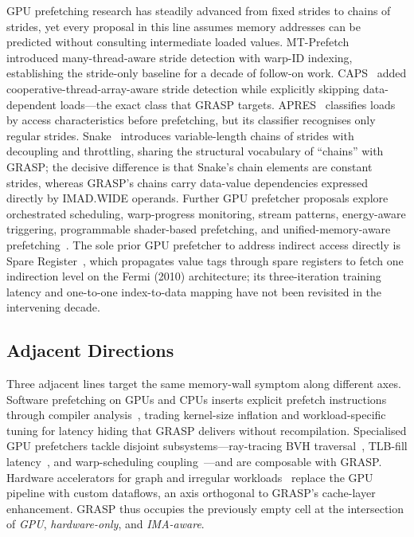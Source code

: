 \documentclass[sigconf, screen, review]{acmart}
\begin{document}
GPU prefetching research has steadily advanced from fixed strides to
chains of strides, yet every proposal in this line assumes memory
addresses can be predicted without consulting intermediate loaded
values.
MT-Prefetch~\cite{lee2010manythread} introduced many-thread-aware
stride detection with warp-ID indexing, establishing the stride-only
baseline for a decade of follow-on work.
CAPS~\cite{koo2018caps} added cooperative-thread-array-aware stride
detection while explicitly skipping data-dependent loads---the exact
class that GRASP targets.
APRES~\cite{oh2016apres} classifies loads by access characteristics
before prefetching, but its classifier recognises only regular
strides.
Snake~\cite{mostofi2023snake} introduces variable-length chains of
strides with decoupling and throttling, sharing the structural
vocabulary of ``chains'' with GRASP; the decisive difference is that
Snake's chain elements are constant strides, whereas GRASP's chains
carry data-value dependencies expressed directly by IMAD.WIDE
operands.
Further GPU prefetcher proposals explore orchestrated scheduling,
warp-progress monitoring, stream patterns, energy-aware triggering,
programmable shader-based prefetching, and unified-memory-aware
prefetching~\cite{jog2013orchestrated,oh2018wasp,neves2018stream,sethia2013apogee,woo2010compass,ganguly2019interplay,guo2018dsap,panda2017gmap}.
The sole prior GPU prefetcher to address indirect access directly is
Spare Register~\cite{lakshminarayana2014spare}, which propagates
value tags through spare registers to fetch one indirection level on
the Fermi (2010) architecture; its three-iteration training latency
and one-to-one index-to-data mapping have not been revisited in the
intervening decade.

\subsection{Adjacent Directions}
\label{sec:related-adjacent}

Three adjacent lines target the same memory-wall symptom along
different axes. Software prefetching on GPUs and CPUs inserts
explicit prefetch instructions through compiler
analysis~\cite{jain2013linearize,ainsworth2019indirect,jain2024dlrm,deng2024swprefetch,sotiropoulos2025asap},
trading kernel-size inflation and workload-specific tuning for
latency hiding that GRASP delivers without recompilation.
Specialised GPU prefetchers tackle disjoint subsystems---ray-tracing
BVH traversal~\cite{chou2023treelet}, TLB-fill
latency~\cite{ha2025latpc}, and warp-scheduling
coupling~\cite{posluns2025tsp}---and are composable with GRASP.
Hardware accelerators for graph and irregular
workloads~\cite{ham2016graphicionado,mukkara2018hats,ahn2015tesseract,rahman2020graphpulse,geng2021igcn,orenes2022maple}
replace the GPU pipeline with custom dataflows, an axis orthogonal
to GRASP's cache-layer enhancement.
GRASP thus occupies the previously empty cell at the intersection of
\textit{GPU}, \textit{hardware-only}, and \textit{IMA-aware}.
\end{document}
